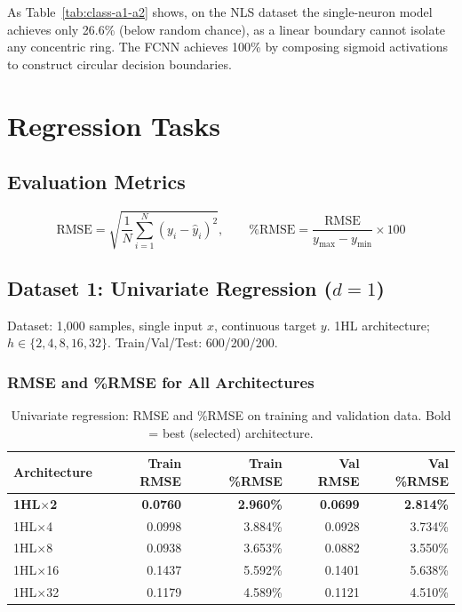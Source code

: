 \documentclass[11pt,a4paper]{article}
\begin{document}
As Table~\ref{tab:class-a1-a2} shows, on the NLS dataset the single-neuron model achieves only 26.6\% (below random chance), as a linear boundary cannot isolate any concentric ring. The FCNN achieves 100\% by composing sigmoid activations to construct circular decision boundaries.

\section{Regression Tasks}

\subsection{Evaluation Metrics}

\begin{equation}
\text{RMSE} = \sqrt{\frac{1}{N}\sum_{i=1}^{N}(y_i - \hat{y}_i)^2}, \qquad \%\text{RMSE} = \frac{\text{RMSE}}{y_{\max} - y_{\min}} \times 100
\end{equation}

\subsection{Dataset 1: Univariate Regression ($d=1$)}

Dataset: 1,000 samples, single input $x$, continuous target $y$. 1HL architecture; $h \in \{2,4,8,16,32\}$. Train/Val/Test: 600/200/200.

\subsubsection*{RMSE and \%RMSE for All Architectures}

\begin{table}[H]
\centering
\caption{Univariate regression: RMSE and \%RMSE on training and validation data. Bold = best (selected) architecture.}
\label{tab:uni-trainval}
\begin{tabular}{lrrrr}
\toprule
Architecture & Train RMSE & Train \%RMSE & Val RMSE & Val \%RMSE \\
\midrule
\textbf{1HL$\times$2}  & \textbf{0.0760} & \textbf{2.960\%} & \textbf{0.0699} & \textbf{2.814\%} \\
1HL$\times$4  & 0.0998 & 3.884\% & 0.0928 & 3.734\% \\
1HL$\times$8  & 0.0938 & 3.653\% & 0.0882 & 3.550\% \\
1HL$\times$16 & 0.1437 & 5.592\% & 0.1401 & 5.638\% \\
1HL$\times$32 & 0.1179 & 4.589\% & 0.1121 & 4.510\% \\
\bottomrule
\end{tabular}
\end{table}
\end{document}
